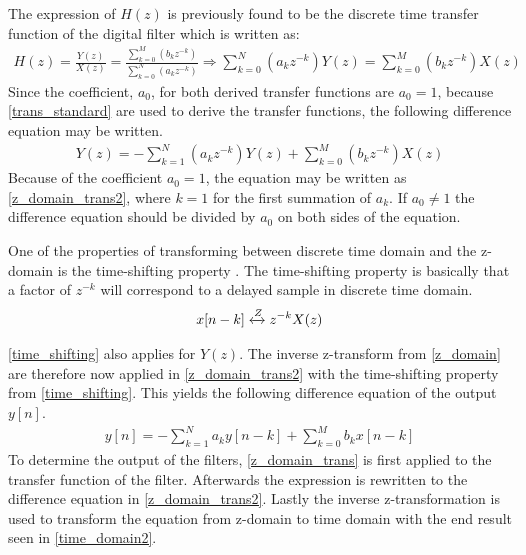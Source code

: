 The expression of $H(z)$ is previously found to be the discrete time transfer function of the digital filter which is written as:
\begin{align}
H(z) = \frac{Y(z)}{X(z)} =\frac{\sum\limits_{k=0}^{M}(b_kz^{-k})}{\sum\limits_{k=0}^{N}(a_kz^{-k})} \Rightarrow \sum\limits_{k=0}^{N}(a_kz^{-k})Y(z) = \sum\limits_{k=0}^{M}(b_kz^{-k})X(z)
\label{z_domain_trans}
\end{align}
Since the coefficient, $a_0$, for both derived transfer functions are $a_0 = 1$, because \autoref{trans_standard} are used to derive the transfer functions, the following difference equation may be written.
\begin{align}
Y(z) = -\sum\limits_{k=1}^{N}(a_kz^{-k})Y(z) + \sum\limits_{k=0}^{M}(b_kz^{-k})X(z)
\label{z_domain_trans2}
\end{align}
Because of the coefficient $a_0 = 1$, the equation may be written as \autoref{z_domain_trans2}, where $k=1$ for the first summation of $a_k$. If $a_0 \not= 1$ the difference equation should be divided by $a_0$ on both sides of the equation.

One of the properties of transforming between discrete time domain and the z-domain is the time-shifting property \citep[p. 131]{oppenheim}. The time-shifting property is basically that a factor of $z^{-k}$ will correspond to a delayed sample in discrete time domain.
\begin{align}
x[n-k] \xleftrightarrow{Z} z^{-k} X(z)
\label{time_shifting}
\end{align}

\autoref{time_shifting} also applies for $Y(z)$. The inverse z-transform from \autoref{z_domain} are therefore now applied in \autoref{z_domain_trans2} with the time-shifting property from \autoref{time_shifting}. This yields the following difference equation of the output $y[n]$.
\begin{align}
y[n] = -\sum\limits_{k=1}^{N}a_ky[n-k] + \sum\limits_{k=0}^{M}b_kx[n-k]
\label{time_domain2}
\end{align}
To determine the output of the filters, \autoref{z_domain_trans} is first applied to the transfer function of the filter. Afterwards the expression is rewritten to the difference equation in \autoref{z_domain_trans2}. Lastly the inverse z-transformation is used to transform the equation from z-domain to time domain with the end result seen in \autoref{time_domain2}.

